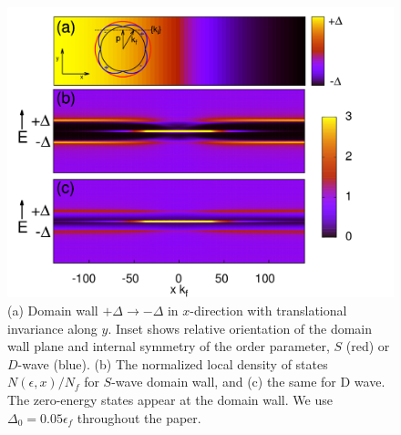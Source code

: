 \documentclass[prb,aps,showpacs,amsmath,twocolumn,10pt]{revtex4-1}
\begin{document}
\begin{figure}
\includegraphics[scale=0.21]{./Fig1}
\caption{\label{fig:1}
(a) Domain wall $+\Delta \to -\Delta$ in $x$-direction with translational
invariance along $y$. Inset shows relative orientation of the domain wall plane 
and internal symmetry of the order parameter, $S$ (red) or $D$-wave (blue). 
(b) The normalized local density of states $N(\epsilon,x)/N_f$ for $S$-wave domain wall, and  
(c) the same for D wave. The zero-energy states appear at the domain wall. 
We use $\Delta_0=0.05\epsilon_f$ throughout the paper.  
} 
\end{figure}

\end{document}

